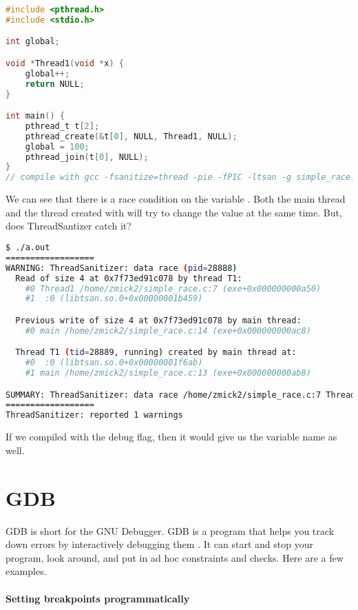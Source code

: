 \begin{lstlisting}[language=C]
#include <pthread.h>
#include <stdio.h>

int global;

void *Thread1(void *x) {
    global++;
    return NULL;
}

int main() {
    pthread_t t[2];
    pthread_create(&t[0], NULL, Thread1, NULL);
    global = 100;
    pthread_join(t[0], NULL);
}
// compile with gcc -fsanitize=thread -pie -fPIC -ltsan -g simple_race.c
\end{lstlisting}

We can see that there is a race condition on the variable . Both the main thread and the thread created with  will try to change the value at the same time. But, does ThreadSantizer catch it?

\begin{lstlisting}[language=bash]
$ ./a.out
==================
WARNING: ThreadSanitizer: data race (pid=28888)
  Read of size 4 at 0x7f73ed91c078 by thread T1:
    #0 Thread1 /home/zmick2/simple_race.c:7 (exe+0x000000000a50)
    #1  :0 (libtsan.so.0+0x00000001b459)

  Previous write of size 4 at 0x7f73ed91c078 by main thread:
    #0 main /home/zmick2/simple_race.c:14 (exe+0x000000000ac8)

  Thread T1 (tid=28889, running) created by main thread at:
    #0  :0 (libtsan.so.0+0x00000001f6ab)
    #1 main /home/zmick2/simple_race.c:13 (exe+0x000000000ab8)

SUMMARY: ThreadSanitizer: data race /home/zmick2/simple_race.c:7 Thread1
==================
ThreadSanitizer: reported 1 warnings
\end{lstlisting}

If we compiled with the debug flag, then it would give us the variable name as well.

\section{GDB}

GDB is short for the GNU Debugger. GDB is a program that helps you track down errors by interactively debugging them \cite{gdb}. It can start and stop your program, look around, and put in ad hoc constraints and checks. Here are a few examples.

\paragraph{Setting breakpoints programmatically}

